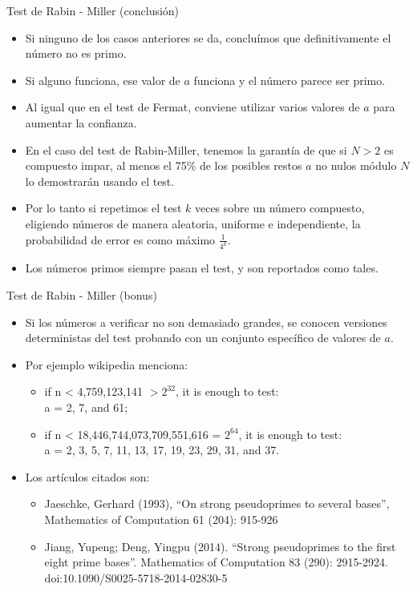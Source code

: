 \documentclass{beamer}
\begin{document}
\begin{frame}{Test de Rabin - Miller (conclusión)}
    \begin{itemize}
      \item Si ninguno de los casos anteriores se da, concluímos que definitivamente el número no es primo.
      \item Si alguno funciona, ese valor de $a$ funciona y el número parece ser primo.
      \item Al igual que en el test de Fermat, conviene utilizar varios valores de $a$ para aumentar la confianza.
      \item En el caso del test de Rabin-Miller, tenemos la garantía de que si $N > 2$ es compuesto impar, al menos el 75\% de los posibles restos $a$ no nulos módulo $N$ lo demostrarán usando el test.
      \item Por lo tanto si repetimos el test $k$ veces sobre un número compuesto, eligiendo números de manera aleatoria, uniforme e independiente, la probabilidad de error es como máximo $\frac{1}{4^k}$.
      \item Los números primos siempre pasan el test, y son reportados como tales.
  \end{itemize}
\end{frame}

\begin{frame}{Test de Rabin - Miller (bonus)}
    \begin{itemize}
      \item Si los números a verificar no son demasiado grandes, se conocen versiones deterministas del test probando con un conjunto específico de valores de $a$.
      \item Por ejemplo wikipedia menciona:
        \begin{itemize}
          \item if n < 4,759,123,141 $>2^{32}$, it is enough to test: \\ a = 2, 7, and 61;
          \item if n < 18,446,744,073,709,551,616 = $2^{64}$, it is enough to test: \\a = 2, 3, 5, 7, 11, 13, 17, 19, 23, 29, 31, and 37.
        \end{itemize}
      \item Los artículos citados son:
        \begin{itemize}
          \item Jaeschke, Gerhard (1993), ``On strong pseudoprimes to several bases'', Mathematics of Computation 61 (204): 915-926
          \item Jiang, Yupeng; Deng, Yingpu (2014). ``Strong pseudoprimes to the first eight prime bases''. Mathematics of Computation 83 (290): 2915-2924. doi:10.1090/S0025-5718-2014-02830-5
        \end{itemize}
  \end{itemize}
\end{frame}
\end{document}
